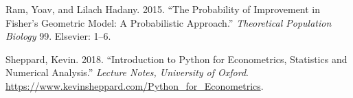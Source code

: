 \documentclass[10pt,twocolumn]{article}
\begin{document}
\hypertarget{ref-ram2015probability}{}
Ram, Yoav, and Lilach Hadany. 2015. ``The Probability of Improvement in
Fisher's Geometric Model: A Probabilistic Approach.'' \emph{Theoretical
Population Biology} 99. Elsevier: 1--6.

\hypertarget{ref-sheppard2018introduction}{}
Sheppard, Kevin. 2018. ``Introduction to Python for Econometrics,
Statistics and Numerical Analysis.'' \emph{Lecture Notes, University of
Oxford}. \url{https://www.kevinsheppard.com/Python_for_Econometrics}.
\end{document}
